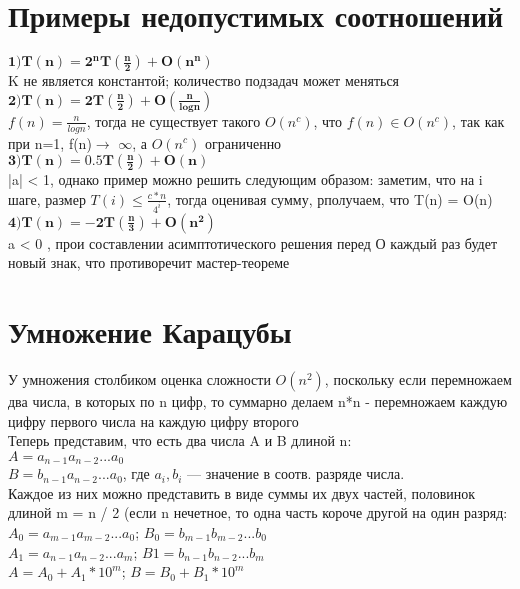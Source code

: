 \documentclass[a4paper,12pt]{article}
\begin{document}
\section{Примеры недопустимых соотношений}
\noindent$\mathbf{1)T(n) = 2^nT(\frac{n}{2})+O(n^n)}$\\
\indent K не является константой; количество подзадач может меняться\\
$\mathbf{2)T(n) = 2T(\frac{n}{2})+O(\frac{n}{logn})}$\\
  $f(n) = \frac{n}{logn}$, тогда не существует такого $O(n^c)$, что $f(n) \in O(n^c)$, так как при  n=1, f(n)$\rightarrow$ $\infty$, а $O(n^c)$ ограниченно\\
$\mathbf{3)T(n) = 0.5T(\frac{n}{2})+O(n)}$\\
\indent|a| < 1, однако пример можно решить следующим образом: заметим, что на i шаге, размер $T(i)\leq\frac{c*n}{4^i}$, тогда оценивая сумму, рполучаем, что T(n) = O(n)\\
$\mathbf{4)T(n) = -2T(\frac{n}{3}) + O(n^2)}$\\
\indent a < 0 , прои составлении асимптотического решения перед О каждый раз будет новый знак, что противоречит мастер-теореме
\section{Умножение Карацубы}

У умножения столбиком оценка сложности $O(n^2)$, поскольку если перемножаем два числа, в которых по n цифр, то суммарно делаем n*n - перемножаем каждую цифру первого числа на каждую цифру второго\\

Теперь представим, что есть два числа A и B длиной n:\\
$A = a_{n-1}a_{n-2}...a_0$\\
$B = b_{n-1}a_{n-2}...a_0$, где $a_i, b_i$ — значение в соотв. разряде числа.\\

Каждое из них можно представить в виде суммы их двух частей, половинок длиной m = n / 2 (если n нечетное, то одна часть короче другой на один разряд:\\
$A_0 = a_{m-1}a_{m-2}...a_0$;      $B_0 = b_{m-1}b_{m-2}...b_0$\\
$A_1 = a_{n-1}a_{n-2}...a_m$;      $B1 = b_{n-1}b_{n-2}...b_m$\\
$A = A_0 + A_1 * 10^m$;    $B = B_0 + B_1 * 10^m$\\
\end{document}
